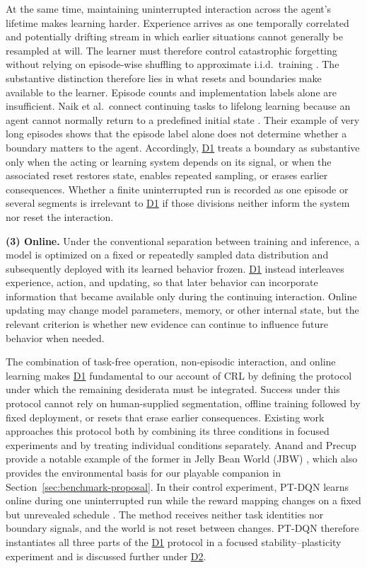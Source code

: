 \documentclass[10pt,journal,compsoc]{IEEEtran}
\DeclareRobustCommand{\Dref}[1]{\hyperref[sec:d#1]{D#1}}
\begin{document}
At the same time, maintaining uninterrupted interaction across the agent's lifetime makes learning harder.
Experience arrives as one temporally correlated and potentially drifting stream in which earlier situations cannot generally be resampled at will.
The learner must therefore control catastrophic forgetting without relying on episode-wise shuffling to approximate i.i.d.\ training \cite{aljundi2019,rolnick2019}.
The substantive distinction therefore lies in what resets and boundaries make available to the learner.
Episode counts and implementation labels alone are insufficient.
Naik et al.\ connect continuing tasks to lifelong learning because an agent cannot normally return to a predefined initial state \cite{naik2019}.
Their example of very long episodes shows that the episode label alone does not determine whether a boundary matters to the agent.
Accordingly, \Dref{1} treats a boundary as substantive only when the acting or learning system depends on its signal, or when the associated reset restores state, enables repeated sampling, or erases earlier consequences.
Whether a finite uninterrupted run is recorded as one episode or several segments is irrelevant to \Dref{1} if those divisions neither inform the system nor reset the interaction.

\noindent\textbf{(3) Online.}
Under the conventional separation between training and inference, a model is optimized on a fixed or repeatedly sampled data distribution and subsequently deployed with its learned behavior frozen.
\Dref{1} instead interleaves experience, action, and updating, so that later behavior can incorporate information that became available only during the continuing interaction.
Online updating may change model parameters, memory, or other internal state, but the relevant criterion is whether new evidence can continue to influence future behavior when needed.

The combination of task-free operation, non-episodic interaction, and online learning makes \Dref{1} fundamental to our account of CRL by defining the protocol under which the remaining desiderata must be integrated.
Success under this protocol cannot rely on human-supplied segmentation, offline training followed by fixed deployment, or resets that erase earlier consequences.
Existing work approaches this protocol both by combining its three conditions in focused experiments and by treating individual conditions separately.
Anand and Precup provide a notable example of the former in Jelly Bean World (JBW) \cite{platanios2020}, which also provides the environmental basis for our playable companion in Section~\ref{sec:benchmark-proposal}.
In their control experiment, PT-DQN learns online during one uninterrupted run while the reward mapping changes on a fixed but unrevealed schedule \cite{anand2023}.
The method receives neither task identities nor boundary signals, and the world is not reset between changes.
PT-DQN therefore instantiates all three parts of the \Dref{1} protocol in a focused stability--plasticity experiment and is discussed further under \Dref{2}.
\end{document}
